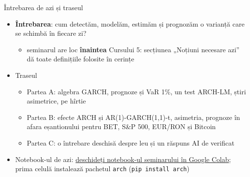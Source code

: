 \begin{frame}{Întrebarea de azi și traseul}
\itemsize{\small}
\begin{itemize}
    \item \textbf{Întrebarea}: cum detectăm, modelăm, estimăm și prognozăm o varianță care se schimbă în fiecare zi?
    \begin{itemize}
        \item seminarul are loc \textbf{înaintea} Cursului 5: secțiunea „Noțiuni necesare azi” dă toate definițiile folosite în cerințe
    \end{itemize}
    \item Traseul
    \begin{itemize}
        \item Partea A: algebra GARCH, prognoze și VaR 1\%, un test ARCH-LM, știri asimetrice, pe hîrtie
        \item Partea B: efecte ARCH și AR(1)-GARCH(1,1)-t, asimetria, prognoze în afara eșantionului pentru BET, S\&P 500, EUR/RON și Bitcoin
        \item Partea C: o întrebare deschisă despre leu și un răspuns AI de verificat
    \end{itemize}
    \item Notebook-ul de azi: \href{\nb}{deschideți notebook-ul seminarului în Google Colab}; prima celulă instalează pachetul \texttt{arch} (\texttt{pip install arch})
\end{itemize}
\end{frame}

